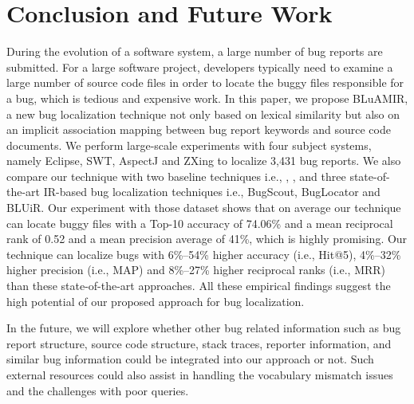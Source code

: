 \documentclass[sigconf,review,anonymous]{acmart}
\begin{document}
\section{Conclusion and Future Work} \label{sec:conclusionANDfuture}
During the evolution of a software system, a large number of bug reports are submitted. For a large software project, developers typically need to examine a large number of source code files in order to locate the buggy files responsible for a bug, which is tedious and expensive work. In this paper, we propose BLuAMIR, a new bug localization technique not only based on lexical similarity but also on an implicit association mapping between bug report keywords and source code documents. We perform large-scale experiments with four subject systems, namely Eclipse, SWT, AspectJ and ZXing to localize 3,431 bug reports.
We also compare our technique with two baseline techniques i.e., \cite{vector-space-model}, \cite{MarcusLSI}, and three state-of-the-art IR-based bug localization techniques i.e., BugScout\cite{Nguyen}, BugLocator\cite{Jian} and BLUiR\cite{Saha}.
Our experiment with those dataset shows that on average our technique can locate buggy files with a Top-10 accuracy of 74.06\% and a mean reciprocal rank of 0.52 and a mean precision average of 41\%, which is highly promising.   
Our technique can localize bugs with 6\%--54\% higher accuracy (i.e., Hit@5), 4\%--32\% higher precision (i.e., MAP) and 8\%--27\% higher reciprocal ranks (i.e., MRR) than these state-of-the-art approaches. All these empirical findings suggest the high potential of our proposed approach for bug localization. 

In the future, we will explore whether other bug related information such as bug report structure, source code structure, stack traces, reporter information, and similar bug information could be integrated into our approach or not. Such external resources could also assist in handling the vocabulary mismatch issues and the challenges with poor queries.

\balance


%


\end{document}
